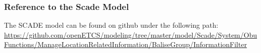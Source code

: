 

\subsubsection{Reference to the Scade Model}
The SCADE model can be found on github under the following path: \url{https://github.com/openETCS/modeling/tree/master/model/Scade/System/ObuFunctions/ManageLocationRelatedInformation/BaliseGroup/InformationFilter}
